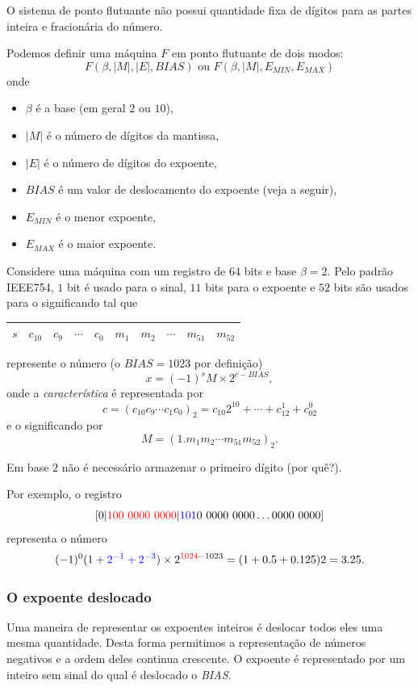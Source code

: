 O sistema de ponto flutuante não possui quantidade fixa de dígitos para as partes inteira e fracionária do número. 

Podemos definir uma máquina $F$ em ponto flutuante de dois modos:
$$ F(\beta,|M|,|E|,BIAS) \text{ ou } F(\beta,|M|,E_{MIN},E_{MAX})$$
onde
\begin{itemize}
 \item $\beta$ é a base (em geral $2$ ou $10$),
 \item $|M|$ é o número de dígitos da mantissa,
 \item $|E|$ é o número de dígitos do expoente,
 \item $BIAS$ é um valor de deslocamento do expoente (veja a seguir),
 \item $E_{MIN}$ é o menor expoente,
 \item $E_{MAX}$ é o maior expoente.
\end{itemize}


Considere uma máquina com um registro de $64$ bits e base $\beta=2$. Pelo padrão IEEE754, $1$ bit é usado para o sinal, $11$ bits para o expoente e $52$ bits são usados para o significando tal que 
\begin{center}
  \begin{tabular}{|c|c|c|c|c|c|c|c|c|c|}\hline
    $s$ & $c_{10}$ & $c_{9}$ & $\cdots$ & $c_{0}$ & $m_1$ & $m_2$ & $\cdots$ & $m_{51}$ & $m_{52}$\\\hline
  \end{tabular}  
\end{center}
represente o número (o $BIAS=1023$ por definição)
$$ x=(-1)^{s}M \times 2^{c-BIAS},$$
onde a \emph{característica} é representada por
$$c=(c_{10}c_9\cdots c_1c_0)_2=c_{10}2^{10}+\cdots+c_12^1+c_02^0 $$
e o significando por
$$M=(1.m_1m_2\cdots m_{51}m_{52})_2.$$

Em base $2$ não é necessário armazenar o primeiro dígito (por quê?).

Por exemplo, o registro
$$
[0|{\color{red}{100~0000~0000}} |{\color{blue}{101}}0~0000~0000\ldots 0000~0000]
$$
representa o número
$$
(-1)^0(1+{\color{blue}{2^{-1}+2^{-3}}})\times  2^{{\color{red}{1024}}-1023}=(1+0.5+0.125)2=3.25.
$$



\subsubsection{O expoente deslocado}
Uma maneira de representar os expoentes inteiros é deslocar todos eles uma mesma quantidade. Desta forma permitimos a representação de números negativos e a ordem deles continua crescente. O expoente é representado por um inteiro sem sinal do qual é deslocado o \emph{BIAS}.


